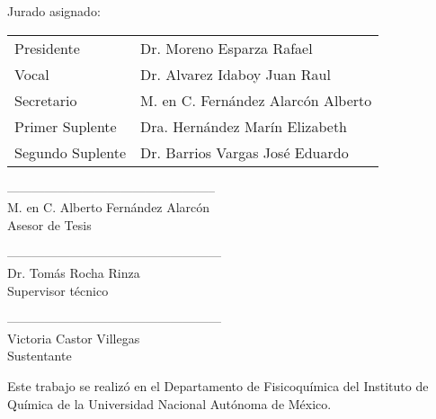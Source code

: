 
\thispagestyle{empty}

\vspace{2cm}
Jurado asignado:
\vspace{1cm}

\begin{tabular}{ll}
Presidente &  Dr. Moreno Esparza Rafael\\
Vocal & Dr. Alvarez Idaboy Juan Raul\\
Secretario & M. en C. Fernández Alarcón Alberto\\
Primer Suplente & Dra. Hernández Marín Elizabeth\\
Segundo Suplente & Dr. Barrios Vargas José Eduardo\\
\end{tabular}

\vspace{5cm}

\begin{multicols}{2}

\begin{center}
--------------------------------------------------\\
M. en C. Alberto Fernández Alarcón \\
Asesor de Tesis\\
\end{center}

\begin{center}
---------------------------------------------------\\
Dr. Tomás Rocha Rinza\\
Supervisor técnico\\
\end{center}

\end{multicols}

\vspace{2cm}

\begin{center}
---------------------------------------------------\\
Victoria Castor Villegas\\
Sustentante\\
\end{center}

\vspace{1.5cm}

\noindent
Este trabajo se realizó en el Departamento de Fisicoquímica 
del Instituto de Química de la Universidad Nacional
Autónoma de México.

\newpage
\thispagestyle{empty}

